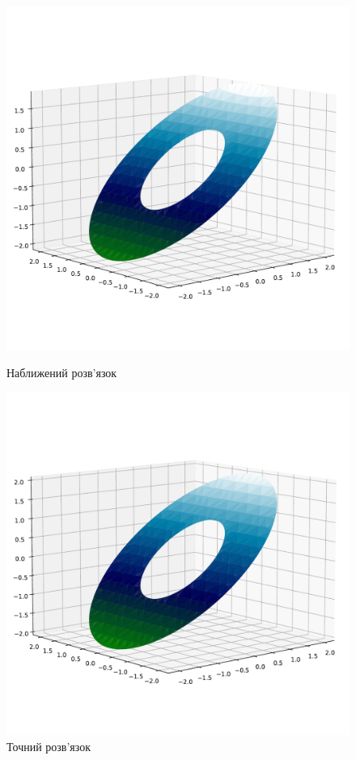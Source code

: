 \documentclass[14pt,a4paper]{extarticle}
\newcounter{e}
\numberwithin{equation}{section}
\numberwithin{figure}{section}
\begin{document}
\begin{figure}[!htb]
	\includegraphics[width=1\textwidth]{resources/ex1-approx.pdf}
	\caption{Наближений розв'язок}
	\label{fig:ex1-approx}
	\endminipage
	\includegraphics[width=1\textwidth]{resources/ex1-ex.pdf}
	\caption{Точний розв'язок}	
	\label{fig:ex1-exact}
	\endminipage\hfill
\end{figure}
\end{document}
